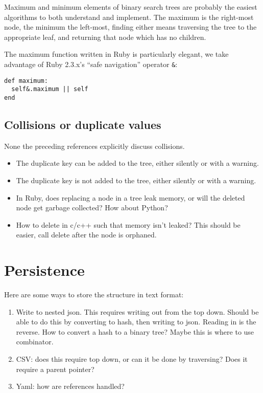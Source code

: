 \documentclass{article}
\begin{document}
\sno Maximum and minimum elements of binary search trees are probably the easiest
algorithms to both understand and implement. \sno The maximum is the right-most
node, the minimum the left-most, finding either means traversing the tree
to the appropriate leaf, and returning that node which has no children.

\sno The maximum function written in Ruby is particularly elegant,
we take advantage of Ruby 2.3.x's ``safe navigation'' operator {\tt \&}:
\begin{lstlisting}[frame=single]
def maximum:
  self&.maximum || self
end
\end{lstlisting}

\subsection{Collisions or duplicate values}

None the preceding references explicitly discuss collisions.

\begin{itemize}
\item The duplicate key can be added to the tree, either silently or with a warning.
\item The duplicate key is not added to the tree, either silently or with a warning.

\item In Ruby, does replacing a node in a tree leak memory, or will the deleted node
get garbage collected? How about Python?

\item How to delete in c/c++ such that memory isn't leaked? This should be easier,
call delete after the node is orphaned.
\end{itemize}

\section{Persistence}

Here are some ways to store the structure in text format:

\begin{enumerate}
\item Write to nested json. This requires writing out from the top
down. Should be able to do this by converting to hash, then
writing to json. Reading in is the reverse. How to convert a
hash to a binary tree? Maybe this is where to use combinator.

\item CSV: does this require top down, or can it be done by traversing?
Does it require a parent pointer?

\item Yaml: how are references handled?
\end{enumerate}
\end{document}
